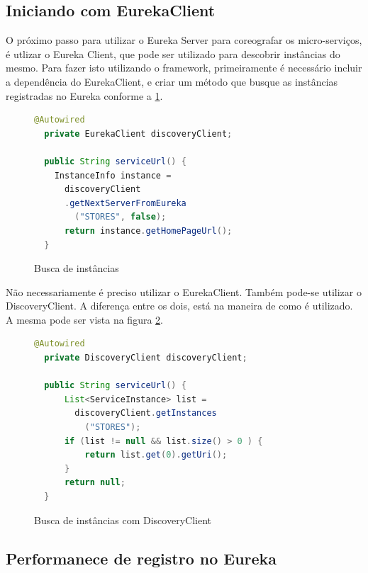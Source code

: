 \documentclass[journal]{IEEEtran}
\begin{document}
\subsection{Iniciando com EurekaClient}

O próximo passo para utilizar o Eureka Server para coreografar os micro-serviços, é utlizar o Eureka Client, que pode ser utilizado para descobrir instâncias do mesmo. Para fazer isto utilizando o framework, primeiramente é necessário incluir a dependência do EurekaClient, e criar um método que busque as instâncias registradas no Eureka conforme a \ref{alg:figuraquatro}.


\begin{figure}[h]
\centering

\begin{lstlisting}[language=Java]
  @Autowired
  private EurekaClient discoveryClient;

  public String serviceUrl() {
    InstanceInfo instance = 
      discoveryClient
      .getNextServerFromEureka
        ("STORES", false);
      return instance.getHomePageUrl();
  } 
\end{lstlisting}

\caption{Busca de instâncias}
\label{alg:figuraquatro}
\end{figure}

Não necessariamente é preciso utilizar o EurekaClient. Também pode-se utilizar o DiscoveryClient. A diferença entre os dois, está na maneira de como é utilizado. A mesma pode ser vista na figura \ref{alg:figuracinco}.

\begin{figure}[h]
\centering

\begin{lstlisting}[language=Java]
  @Autowired
  private DiscoveryClient discoveryClient;

  public String serviceUrl() {
      List<ServiceInstance> list = 
        discoveryClient.getInstances
          ("STORES");
      if (list != null && list.size() > 0 ) {
          return list.get(0).getUri();
      }
      return null;
  }
\end{lstlisting}

\caption{Busca de instâncias com DiscoveryClient}
\label{alg:figuracinco}
\end{figure}

\subsection{Performanece de registro no Eureka}
\end{document}
